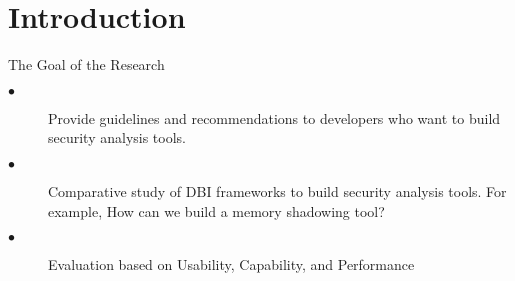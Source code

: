 \section {Introduction} 
\label{sec:intro}
The Goal of the Research
\begin{description}
\item[$\bullet$] Provide guidelines and recommendations to developers who want to build security analysis tools.
\item[$\bullet$] Comparative study of DBI frameworks to build security analysis tools. For example, How can we build a memory shadowing tool?
\item[$\bullet$] Evaluation based on Usability, Capability, and Performance
\end{description} 
